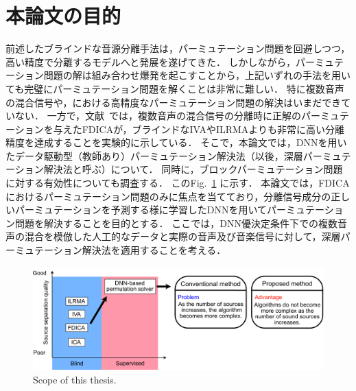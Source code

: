 \section{本論文の目的}
前述したブラインドな音源分離手法は，パーミュテーション問題を回避しつつ，高い精度で分離するモデルへと発展を遂げてきた．
しかしながら，パーミュテーション問題の解は組み合わせ爆発を起こすことから，上記いずれの手法を用いても完璧にパーミュテーション問題を解くことは非常に難しい．
特に複数音声の混合信号や，における高精度なパーミュテーション問題の解決はいまだできていない．
一方で，文献~\cite{EU}では，複数音声の混合信号の分離時に正解のパーミュテーションを与えたFDICAが，ブラインドなIVAやILRMAよりも非常に高い分離精度を達成することを実験的に示している．
そこで，本論文では，DNNを用いたデータ駆動型（教師あり）パーミュテーション解決法（以後，深層パーミュテーション解決法と呼ぶ）について．
同時に，ブロックパーミュテーション問題に対する有効性についても調査する．
このFig.~\ref{fig:scope} に示す．
本論文では，FDICAにおけるパーミュテーション問題のみに焦点を当てており，分離信号成分の正しいパーミュテーションを予測する様に学習したDNNを用いてパーミュテーション問題を解決することを目的とする．
ここでは，DNN優決定条件下での複数音声の混合を模倣した人工的なデータと実際の音声及び音楽信号に対して，深層パーミュテーション解決法を適用することを考える．

\begin{figure}[t]
    \vspace{4pt}
    \begin{center}
        \includegraphics[width=1.0\columnwidth]{figures/chapter1/scope.pdf}
    \end{center}
    \vspace{-8pt}
	\caption{Scope of this thesis.}
	\label{fig:scope}
\end{figure}


